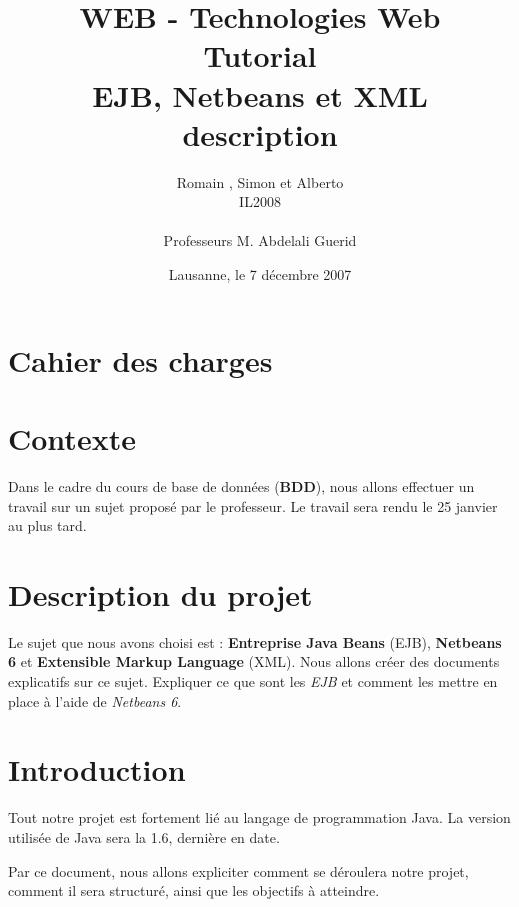 \documentclass[a4paper, 11pt]{article}
\title{ %
\small{WEB - Technologies Web} \\ \vspace{2cm}
\huge{Tutorial} \\ \vspace{1cm} 
EJB, Netbeans et XML\\ 
\small{description}}
\author{Romain \bsc{de Wolff}, Simon \bsc{Hintermann} et Alberto \bsc{Asuero Arroyo}\\ IL2008 \\ \vspace{2cm} \\ Professeurs M. Abdelali Guerid \vspace{2cm} 
}
\date{Lausanne, le 7 décembre 2007}  %
\begin{document}
\maketitle
\thispagestyle{empty} %
\newpage
 \setcounter{page}{1} 

{\setlength{\baselineskip}{1.2\baselineskip}
\parskip=10pt
\section*{Cahier des charges} 
\section{Contexte}

	Dans le cadre du cours de base de données (\textbf{BDD}), nous allons effectuer un travail sur un sujet proposé par le professeur. Le travail sera rendu le 25 janvier au plus tard.
	
\section{Description du projet}

	Le sujet que nous avons choisi est : \textbf{Entreprise Java Beans} (EJB), \textbf{Netbeans 6} et \textbf{Extensible Markup Language} (XML). Nous allons créer des documents explicatifs sur ce sujet. Expliquer ce que sont les \emph{EJB} et comment les mettre en place à l'aide de \emph{Netbeans 6}.

\section{Introduction}
	
	Tout notre projet est fortement lié au langage de programmation Java. La version utilisée de Java sera la 1.6, dernière en date.

	Par ce document, nous allons expliciter comment se déroulera notre projet, comment il sera structuré, ainsi que les objectifs à atteindre.

}
\end{document}
